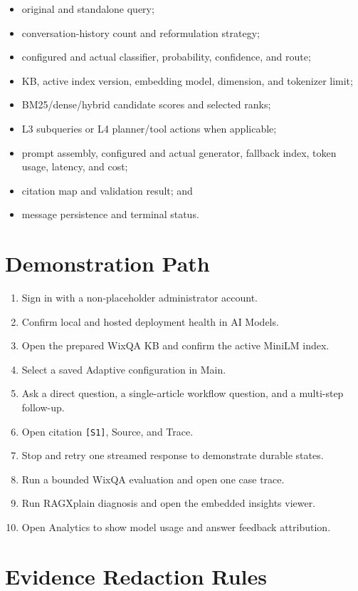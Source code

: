 \begin{itemize}
  \item original and standalone query;
  \item conversation-history count and reformulation strategy;
  \item configured and actual classifier, probability, confidence, and route;
  \item KB, active index version, embedding model, dimension, and tokenizer
  limit;
  \item BM25/dense/hybrid candidate scores and selected ranks;
  \item L3 subqueries or L4 planner/tool actions when applicable;
  \item prompt assembly, configured and actual generator, fallback index, token
  usage, latency, and cost;
  \item citation map and validation result; and
  \item message persistence and terminal status.
\end{itemize}

\section{Demonstration Path}

\begin{enumerate}
  \item Sign in with a non-placeholder administrator account.
  \item Confirm local and hosted deployment health in AI Models.
  \item Open the prepared WixQA KB and confirm the active MiniLM index.
  \item Select a saved Adaptive configuration in Main.
  \item Ask a direct question, a single-article workflow question, and a
  multi-step follow-up.
  \item Open citation \texttt{[S1]}, Source, and Trace.
  \item Stop and retry one streamed response to demonstrate durable states.
  \item Run a bounded WixQA evaluation and open one case trace.
  \item Run RAGXplain diagnosis and open the embedded insights viewer.
  \item Open Analytics to show model usage and answer feedback attribution.
\end{enumerate}

\section{Evidence Redaction Rules}

